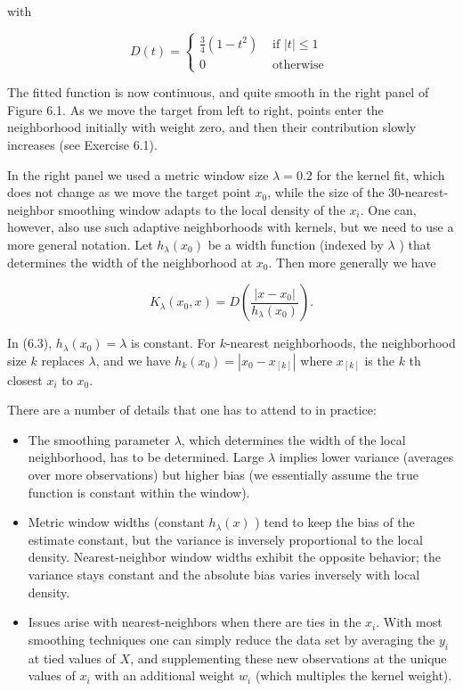 \documentclass[10pt]{article}
\begin{document}
with

\[
D(t)= \begin{cases}\frac{3}{4}\left(1-t^{2}\right) & \text { if }|t| \leq 1  \tag{6.4}\\ 0 & \text { otherwise }\end{cases}
\]

The fitted function is now continuous, and quite smooth in the right panel of Figure 6.1. As we move the target from left to right, points enter the neighborhood initially with weight zero, and then their contribution slowly increases (see Exercise 6.1).

In the right panel we used a metric window size $\lambda=0.2$ for the kernel fit, which does not change as we move the target point $x_{0}$, while the size of the 30-nearest-neighbor smoothing window adapts to the local density of the $x_{i}$. One can, however, also use such adaptive neighborhoods with kernels, but we need to use a more general notation. Let $h_{\lambda}\left(x_{0}\right)$ be a width function (indexed by $\lambda$ ) that determines the width of the neighborhood at $x_{0}$. Then more generally we have


\begin{equation*}
K_{\lambda}\left(x_{0}, x\right)=D\left(\frac{\left|x-x_{0}\right|}{h_{\lambda}\left(x_{0}\right)}\right) . \tag{6.5}
\end{equation*}


In (6.3), $h_{\lambda}\left(x_{0}\right)=\lambda$ is constant. For $k$-nearest neighborhoods, the neighborhood size $k$ replaces $\lambda$, and we have $h_{k}\left(x_{0}\right)=\left|x_{0}-x_{[k]}\right|$ where $x_{[k]}$ is the $k$ th closest $x_{i}$ to $x_{0}$.

There are a number of details that one has to attend to in practice:

\begin{itemize}
  \item The smoothing parameter $\lambda$, which determines the width of the local neighborhood, has to be determined. Large $\lambda$ implies lower variance (averages over more observations) but higher bias (we essentially assume the true function is constant within the window).
  \item Metric window widths (constant $h_{\lambda}(x)$ ) tend to keep the bias of the estimate constant, but the variance is inversely proportional to the local density. Nearest-neighbor window widths exhibit the opposite behavior; the variance stays constant and the absolute bias varies inversely with local density.
  \item Issues arise with nearest-neighbors when there are ties in the $x_{i}$. With most smoothing techniques one can simply reduce the data set by averaging the $y_{i}$ at tied values of $X$, and supplementing these new observations at the unique values of $x_{i}$ with an additional weight $w_{i}$ (which multiples the kernel weight).
\end{itemize}
\end{document}
